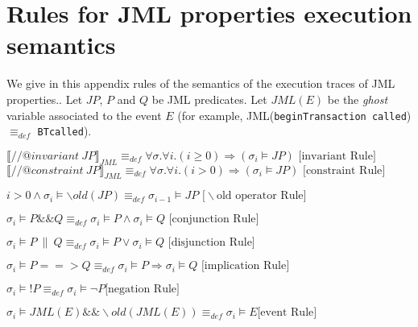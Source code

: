 

\section{Rules for JML properties execution semantics}
\label{sec-rules}

We give in this appendix rules of the semantics of the execution traces of JML properties.. Let $JP$, $P$ and $Q$ be JML predicates. Let $JML(E)$ be the \textit{ghost} variable associated to the event $E$ (for example, JML(\texttt{beginTransaction called}) $\equiv_{def}$ \texttt{BTcalled}).\smallskip







$\llbracket //@ invariant ~ JP \rrbracket_{JML}  \equiv_{def} \forall \sigma. \forall i . (i \geq 0) \Rightarrow (\sigma_i \models JP )   \mbox{ [invariant Rule]} $\smallskip
$ \llbracket  //@ constraint ~ JP \rrbracket_{JML} \equiv_{def} \forall \sigma . \forall i . (i > 0) \Rightarrow (\sigma_i \models JP )  \mbox{ [constraint Rule]} $\smallskip





$ i > 0 \wedge \sigma_i \models \backslash old(JP)  \equiv_{def} \sigma_{i-1} \models JP \mbox{ [} \backslash \mbox{old operator Rule]}$\smallskip

$ \sigma_i \models P \&\& Q \equiv_{def} \sigma_i \models P  \wedge \sigma_i \models Q  
\mbox{ [conjunction Rule]}$\smallskip

$ \sigma_i \models P ~ \|~ Q \equiv_{def} \sigma_i \models P  \vee \sigma_i \models Q  \mbox{ [disjunction Rule]}$\smallskip


$ \sigma_i \models P ==> Q  \equiv_{def} \sigma_i \models P  \Rightarrow \sigma_i \models Q \mbox{ [implication Rule]}$\smallskip

$ \sigma_i \models !P  \equiv_{def}  \sigma_i \models \neg P \mbox{[negation Rule]}$\smallskip


$ \sigma_i \models JML(E) \&\& \backslash old(JML(E))  \equiv_{def} \sigma_i \models E  \mbox{[event Rule]}$\smallskip

